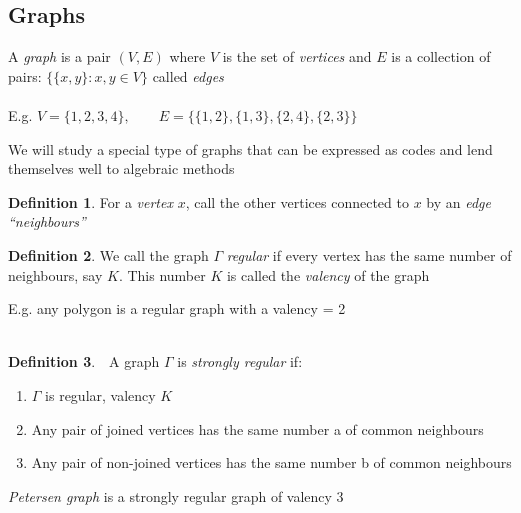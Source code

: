 \documentclass[]{article}
\theoremstyle{definition}
\newtheorem*{defn}{Definition}
\theoremstyle{remark}
\numberwithin{equation}{section}
\begin{document}
	\subsection{Graphs}
		A \emph{graph} is a pair $(V, E)$ where $V$ is the set of \emph{vertices} and $E$ is a collection of pairs: $\{\{x,y\}: x,y \in V\}$ called \emph{edges}\\
		\\
		E.g. $V = \{1,2,3,4\}, \qquad E = \{\{1,2\}, \{1,3\}, \{2,4\}, \{2,3\}\}$\\


		We will study a special type of graphs that can be expressed as codes and lend themselves well to algebraic methods\\
		\begin{defn}
		For a \emph{vertex} $x$, call the other vertices connected to $x$ by an \emph{edge} \emph{``neighbours''}
		\end{defn}

		\begin{defn}
		We call the graph $\Gamma$ \emph{regular} if every vertex has the same number of neighbours, say $K$. This number $K$ is called the \emph{valency} of the graph
		\end{defn}
		E.g. any polygon is a regular graph with a valency = 2\\
		\\
		\begin{figure}[H]
		\end{figure}
		\begin{defn}
 		A graph $\Gamma$ is \emph{strongly regular} if:
		\begin{enumerate}
			\item $\Gamma$ is regular, valency $K$
			\item Any pair of joined vertices has the same number a of common neighbours
			\item Any pair of non-joined vertices has the same number b of common neighbours
		\end{enumerate}
		\end{defn}
		\emph{Petersen graph} is a strongly regular graph of valency 3\\
\end{document}
